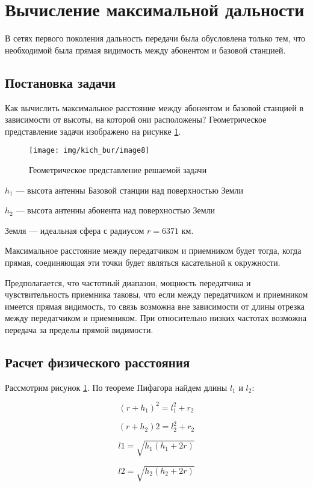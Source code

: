 \section{Вычисление максимальной дальности}
В сетях первого поколения дальность передачи была обусловлена только
тем, что необходимой была прямая видимость между абонентом
и базовой станцией.
\subsection{Постановка задачи}
Как вычислить максимальное расстояние между абонентом и базовой станцией в зависимости от высоты, на которой они расположены? Геометрическое представление задачи изображено на рисунке \ref{fig:img8}.

\begin{figure}[H]
	\centering
	\texttt{[image: img/kich\_bur/image8]}
	\caption{Геометрическое представление решаемой задачи}
	\label{fig:img8}
\end{figure}

$ h_1 $ --- высота антенны Базовой станции над поверхностью Земли 

$ h_2 $ --- высота антенны абонента над поверхностью Земли 

Земля --- идеальная сфера с радиусом $r = 6371$ км.

Максимальное расстояние между передатчиком и приемником будет тогда, когда прямая, соединяющая эти точки будет являться касательной к окружности. 

Предполагается, что частотный диапазон, мощность передатчика и чувствительность
приемника таковы, что если между передатчиком и приемником имеется
прямая видимость, то связь возможна вне зависимости от длины отрезка
между передатчиком и приемником. При относительно низких частотах
возможна передача за пределы прямой видимости. 

\subsection{Расчет физического расстояния}

Рассмотрим рисунок \ref{fig:img8}. По теореме Пифагора найдем длины $ l_1 $ и $ l_2 $: 

\[
(r+h_{1})^2=l_1^{2}+r_2
\]

\[
(r+h_{2})2=l_2^{2}+r_2
\]

\[
l1=\sqrt{h_{1}\left(h_{1}+2r\right)}
\]

\[
l2=\sqrt{h_{2}\left(h_{2}+2r\right)}
\]


